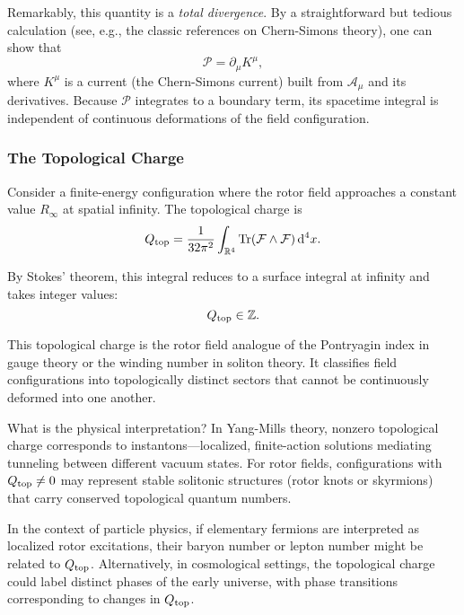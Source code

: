 \documentclass[11pt,a4paper]{article}
\numberwithin{equation}{section}
\theoremstyle{plain}
\theoremstyle{definition}
\theoremstyle{remark}
\DeclareMathOperator{\Tr}{Tr}
\newcommand{\dd}{\mathrm{d}}
\begin{document}
Remarkably, this quantity is a \emph{total divergence}. By a straightforward but tedious calculation (see, e.g., the classic references on Chern-Simons theory), one can show that
\begin{equation}
\mathcal{P} = \partial_\mu K^\mu,
\end{equation}
where $K^\mu$ is a current (the Chern-Simons current) built from $\mathcal{A}_\mu$ and its derivatives. Because $\mathcal{P}$ integrates to a boundary term, its spacetime integral is independent of continuous deformations of the field configuration.

\subsubsection{The Topological Charge}

Consider a finite-energy configuration where the rotor field approaches a constant value $R_\infty$ at spatial infinity. The topological charge is
\begin{equation}
Q_{\rm top} = \frac{1}{32\pi^2}\int_{\mathbb{R}^4} \Tr(\mathcal{F}\wedge\mathcal{F})\, \dd^4x.
\label{eq:Q-top}
\end{equation}

By Stokes' theorem, this integral reduces to a surface integral at infinity and takes integer values:
\begin{equation}
Q_{\rm top} \in \mathbb{Z}.
\end{equation}

This topological charge is the rotor field analogue of the Pontryagin index in gauge theory or the winding number in soliton theory. It classifies field configurations into topologically distinct sectors that cannot be continuously deformed into one another.

What is the physical interpretation? In Yang-Mills theory, nonzero topological charge corresponds to instantons---localized, finite-action solutions mediating tunneling between different vacuum states. For rotor fields, configurations with $Q_{\rm top} \neq 0$ may represent stable solitonic structures (rotor knots or skyrmions) that carry conserved topological quantum numbers.

In the context of particle physics, if elementary fermions are interpreted as localized rotor excitations, their baryon number or lepton number might be related to $Q_{\rm top}$. Alternatively, in cosmological settings, the topological charge could label distinct phases of the early universe, with phase transitions corresponding to changes in $Q_{\rm top}$.
\end{document}
